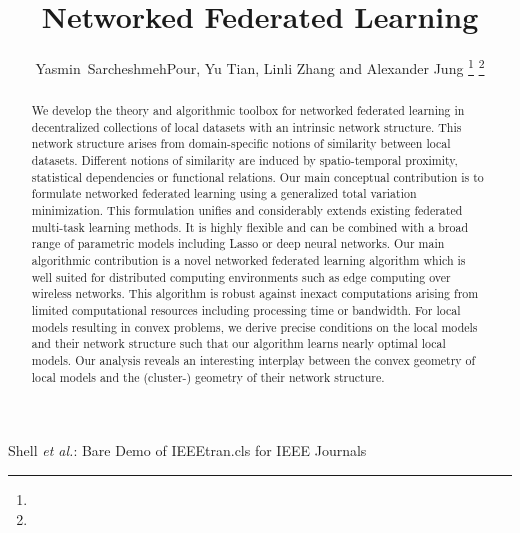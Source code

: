 \documentclass[lettersize,journal]{IEEEtran}
\begin{document}
\title{Networked Federated Learning}
%
%
%

\author{Yasmin~SarcheshmehPour, Yu Tian, Linli Zhang and Alexander Jung%
	\thanks{}%
	\thanks{}%
}



\maketitle

%
{Shell \MakeLowercase{\textit{et al.}}: Bare Demo of IEEEtran.cls for IEEE Journals}


\begin{abstract}
We develop the theory and algorithmic toolbox for networked federated learning in 
decentralized collections of local datasets with an intrinsic network structure. This 
network structure arises from domain-specific notions of similarity between local datasets. 
Different notions of similarity are induced by spatio-temporal proximity, statistical 
dependencies or functional relations. Our main conceptual contribution is to formulate 
networked federated learning using a generalized total variation minimization. This 
formulation unifies and considerably extends existing federated multi-task learning 
methods. It is highly flexible and can be combined with a broad range of parametric 
models including Lasso or deep neural networks. Our main algorithmic contribution 
is a novel networked federated  learning algorithm which is well suited for distributed computing 
environments such as edge computing over wireless networks. This algorithm is robust 
against inexact computations arising from limited computational resources including processing 
time or bandwidth. For local models resulting in convex problems, we derive precise conditions 
on the local models and their network structure such that our algorithm learns nearly optimal 
local models. Our analysis reveals an interesting interplay between the convex 
geometry of local models and the (cluster-) geometry of their network structure. 
\end{abstract}
\end{document}
